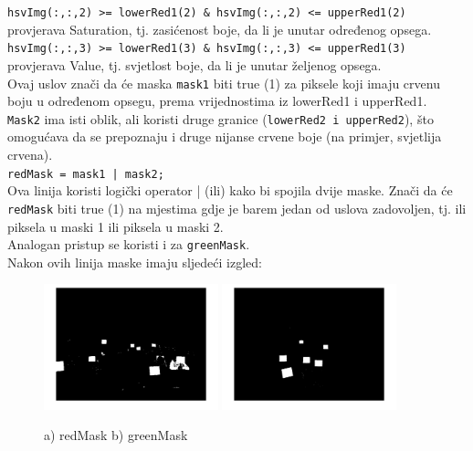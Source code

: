 \documentclass[a4paper,12pt]{article}
\begin{document}
 \texttt{hsvImg(:,:,2) >= lowerRed1(2) \& hsvImg(:,:,2) <= upperRed1(2)} provjerava Saturation, tj. zasićenost boje, da li je unutar određenog opsega.\\

\texttt{hsvImg(:,:,3) >= lowerRed1(3) \& hsvImg(:,:,3) <= upperRed1(3)} provjerava Value, tj. svjetlost boje, da li je unutar željenog opsega. \\

Ovaj uslov znači da će maska \texttt{mask1} biti true (1) za piksele koji imaju crvenu boju u određenom opsegu, prema vrijednostima iz lowerRed1 i upperRed1.\\

\texttt{Mask2} ima isti oblik, ali koristi druge granice (\texttt{lowerRed2 i upperRed2}), što omogućava da se prepoznaju i druge nijanse crvene boje (na primjer, svjetlija crvena).\\

\texttt{redMask = mask1 | mask2;}\\

Ova linija koristi logički operator | (ili) kako bi spojila dvije maske. Znači da će \texttt{redMask} biti true (1) na mjestima gdje je barem jedan od uslova zadovoljen, tj. ili piksela u maski 1 ili piksela u maski 2. \\

\noindent Analogan pristup se koristi i za \texttt{greenMask}.
\\

Nakon ovih linija maske imaju sljedeći izgled:
\begin{figure}[htbp]
    \centering
    \includegraphics[width=0.45\textwidth]{img/redmask.jpg}
    \hfill
    \includegraphics[width=0.45\textwidth]{img/greenmask.jpg} 
    \caption{a) redMask b) greenMask}
    \label{fig:redMaskgreenMask}
\end{figure}
\end{document}
